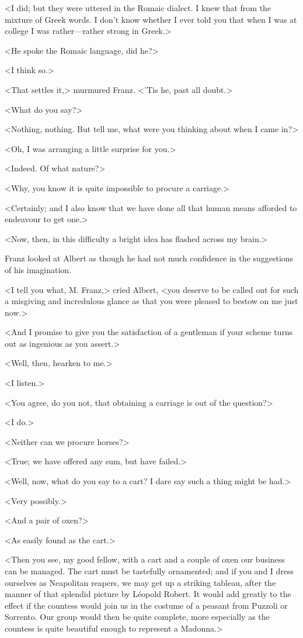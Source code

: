  <I did; but they were uttered in the Romaic dialect. I knew that from the mixture of Greek words. I don't know whether I ever told you that when I was at college I was rather—rather strong in Greek.> 

 <He spoke the Romaic language, did he?> 

 <I think so.> 

 <That settles it,> murmured Franz. <'Tis he, past all doubt.> 

 <What do you say?> 

 <Nothing, nothing. But tell me, what were you thinking about when I came in?> 

 <Oh, I was arranging a little surprise for you.> 

 <Indeed. Of what nature?> 

 <Why, you know it is quite impossible to procure a carriage.> 

 <Certainly; and I also know that we have done all that human means afforded to endeavour to get one.> 

 <Now, then, in this difficulty a bright idea has flashed across my brain.> 

 Franz looked at Albert as though he had not much confidence in the suggestions of his imagination. 

 <I tell you what, M. Franz,> cried Albert, <you deserve to be called out for such a misgiving and incredulous glance as that you were pleased to bestow on me just now.> 

 <And I promise to give you the satisfaction of a gentleman if your scheme turns out as ingenious as you assert.> 

 <Well, then, hearken to me.> 

 <I listen.> 

 <You agree, do you not, that obtaining a carriage is out of the question?> 

 <I do.> 

 <Neither can we procure horses?> 

 <True; we have offered any sum, but have failed.> 

 <Well, now, what do you say to a cart? I dare say such a thing might be had.> 

 <Very possibly.> 

 <And a pair of oxen?> 

 <As easily found as the cart.> 

 <Then you see, my good fellow, with a cart and a couple of oxen our business can be managed. The cart must be tastefully ornamented; and if you and I dress ourselves as Neapolitan reapers, we may get up a striking tableau, after the manner of that splendid picture by Léopold Robert. It would add greatly to the effect if the countess would join us in the costume of a peasant from Puzzoli or Sorrento. Our group would then be quite complete, more especially as the countess is quite beautiful enough to represent a Madonna.> 


